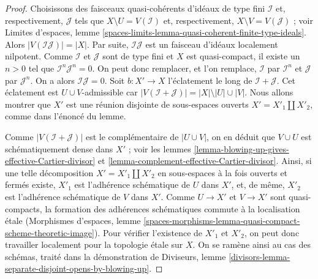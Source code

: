 \begin{proof}
Choisissons des faisceaux quasi-cohérents d'idéaux de type fini $\mathcal{I}$
et, respectivement, $\mathcal{J}$ tels que $X \setminus U = V(\mathcal{I})$
et, respectivement, $X \setminus V = V(\mathcal{J})$ ; voir
Limites d'espaces, lemme
\ref{spaces-limits-lemma-quasi-coherent-finite-type-ideals}.
Alors $|V(\mathcal{I}\mathcal{J})| = |X|$. Par suite,
$\mathcal{I}\mathcal{J}$ est un faisceau d'idéaux localement nilpotent.
Comme $\mathcal{I}$ et $\mathcal{J}$ sont de type fini et $X$
est quasi-compact, il existe un $n > 0$ tel que
$\mathcal{I}^n \mathcal{J}^n = 0$. On peut donc remplacer, et l'on remplace, $\mathcal{I}$
par $\mathcal{I}^n$ et $\mathcal{J}$ par $\mathcal{J}^n$. On a alors
$\mathcal{I} \mathcal{J} = 0$. Soit $b : X' \to X$ l'éclatement
le long de $\mathcal{I} + \mathcal{J}$. Cet éclatement est $U \cup V$-admissible
car $|V(\mathcal{I} + \mathcal{J})| = |X| \setminus |U| \cup |V|$.
Nous allons montrer que $X'$ est une réunion disjointe de sous-espaces ouverts
$X' = X'_1 \amalg X'_2$, comme dans l'énoncé du lemme.

\medskip\noindent
Comme $|V(\mathcal{I} + \mathcal{J})|$ est le complémentaire de
$|U \cup V|$, on en déduit que $V \cup U$ est schématiquement
dense dans $X'$ ; voir les
lemmes \ref{lemma-blowing-up-gives-effective-Cartier-divisor} et
\ref{lemma-complement-effective-Cartier-divisor}.
Ainsi, si une telle décomposition $X' = X'_1 \amalg X'_2$
en sous-espaces à la fois ouverts et fermés existe, $X'_1$ est l'adhérence
schématique de $U$ dans $X'$, et, de même, $X'_2$ est
l'adhérence schématique de $V$ dans $X'$. Comme $U \to X'$
et $V \to X'$ sont quasi-compacts, la formation des adhérences
schématiques commute à la localisation étale (Morphismes d'espaces,
lemme \ref{spaces-morphisms-lemma-quasi-compact-scheme-theoretic-image}).
Pour vérifier l'existence de $X'_1$ et $X'_2$, on peut donc travailler localement
pour la topologie étale sur $X$. On se ramène ainsi au cas des schémas, traité
dans la démonstration de Diviseurs, lemme
\ref{divisors-lemma-separate-disjoint-opens-by-blowing-up}.
\end{proof}


























